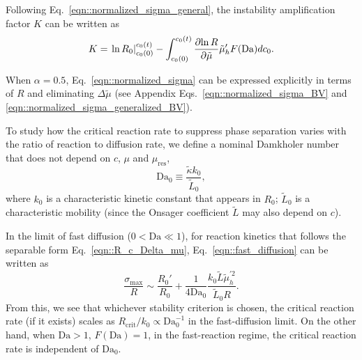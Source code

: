 \documentclass[reprint,aps,pre,superscriptaddress]{revtex4-2}
\newcommand{\pderiv}[2]{\frac{\partial {#1}}{\partial {#2}}}
\let\originalleft\left
\let\originalright\right
\renewcommand{\left}{\mathopen{}\mathclose\bgroup\originalleft}
\renewcommand{\right}{\aftergroup\egroup\originalright}
\begin{document}
Following Eq.~\ref{eqn::normalized_sigma_general}, the instability amplification factor $K$ can be written as
\begin{equation}
  K = \left. \ln{R_0} \right|_{c_0(0)}^{c_0(t)} - \int_{c_0(0)}^{c_0(t)}{\pderiv{\ln{R}}{\tilde{\mu}} \tilde{\mu}_h' F(\text{Da}) dc_0}.
\end{equation}

When $\alpha=0.5$, Eq.~\ref{eqn::normalized_sigma} can be expressed explicitly in terms of $R$ and eliminating $\Delta \tilde{\mu}$ (see Appendix Eqs.~\ref{eqn::normalized_sigma_BV} and \ref{eqn::normalized_sigma_generalized_BV}).


To study how the critical reaction rate to suppress phase separation varies with the ratio of reaction to diffusion rate, we define a nominal Damkholer number that does not depend on $c$, $\mu$ and $\mu_\text{res}$,
\begin{equation}
  \text{Da}_0 \equiv \frac{\tilde{\kappa} k_0}{\tilde{L}_0},
\end{equation}
where $k_0$ is a characteristic kinetic constant that appears in $R_0$; $\tilde{L}_0$ is a characteristic mobility (since the Onsager coefficient $\tilde{L}$ may also depend on $c$).

In the limit of fast diffusion ($0<\text{Da} \ll 1$), for reaction kinetics that follows the separable form Eq.~\ref{eqn::R_c_Delta_mu}, Eq.~\ref{eqn::fast_diffusion} can be written as
\begin{equation} \label{eqn::sigma_Da_ll_1}
  \frac{\sigma_\text{max}}{R} \sim  \frac{R_0'}{R_0} +  \frac{ 1}{4\text{Da}_0} \frac{k_0\tilde{L} \tilde{\mu}_h^{\prime2}}{\tilde{L}_0 R}.
\end{equation}
From this, we see that whichever stability criterion is chosen, the critical reaction rate (if it exists) scales as $R_\text{crit}/k_0 \propto \text{Da}_0^{-1}$ in the fast-diffusion limit.
On the other hand, when $\text{Da}>1$, $F(\text{Da})=1$, in the fast-reaction regime, the critical reaction rate is independent of $\text{Da}_0$.
\end{document}
